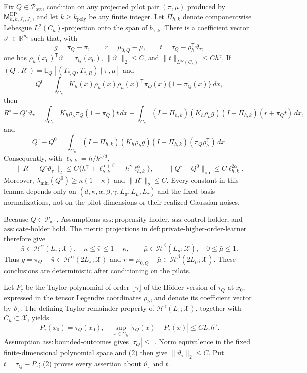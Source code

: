 Fix \(Q\in\mathcal P_{\mathrm{att}}\), condition on any projected pilot pair \((\bar\pi,\bar\mu)\) produced by \(\mathsf M_{h,k,J_\pi,J_\mu}^{\mathrm{DP}}\), and let \(k\ge k_{\mathrm{poly}}\) be any finite integer.  Let \(\Pi_{h,k}\) denote componentwise Lebesgue \(L^2(C_h)\)-projection onto the span of \(b_{h,k}\).  There is a coefficient vector \(\vartheta_\tau\in\mathbb R^{p_\gamma}\) such that, with
\[
 g=\pi_Q-\bar\pi,\qquad r=\mu_{0,Q}-\bar\mu,
 \qquad t=\tau_Q-\rho_h^{\mathsf T}\vartheta_\tau,
\]
one has \(\rho_h(x_0)^{\mathsf T}\vartheta_\tau=\tau_Q(x_0)\), \(\lVert\vartheta_\tau\rVert_2\le C\), and \(\lVert t\rVert_{L^\infty(C_h)}\le Ch^\gamma\).  If \((Q^\circ,R^\circ)=\mathbb E_Q[(T_{*,Q},T_{*,R})\mid\bar\pi,\bar\mu]\) and
\[
 Q^0=\int_{C_h}K_h(x)\rho_h(x)\rho_h(x)^{\mathsf T}
       \pi_Q(x)\{1-\pi_Q(x)\}\,dx,
\]
then
\[
 R^\circ-Q^\circ\vartheta_\tau
 =\int_{C_h}K_h\rho_h\pi_Q(1-\pi_Q)t\,dx
 +\int_{C_h}(I-\Pi_{h,k})(K_h\rho_h g)
                 (I-\Pi_{h,k})(r+\pi_Qt)\,dx,
\]
and
\[
 Q^\circ-Q^0
 =\int_{C_h}(I-\Pi_{h,k})(K_h\rho_h g)
                 (I-\Pi_{h,k})(\pi_Q\rho_h^{\mathsf T})\,dx.
\]
Consequently, with \(\ell_{h,k}=h/k^{1/d}\),
\[
 \lVert R^\circ-Q^\circ\vartheta_\tau\rVert_2
 \le C\{h^\gamma+\ell_{h,k}^{\alpha+\beta}
                  +h^\gamma\ell_{h,k}^\alpha\},
 \qquad
 \lVert Q^\circ-Q^0\rVert_{\mathrm{op}}
 \le C\ell_{h,k}^{2\alpha}.
\]
Moreover, \(\lambda_{\min}(Q^0)\ge\kappa(1-\kappa)\) and \(\lVert R^\circ\rVert_2\le C\).  Every constant in this lemma depends only on \((d,\kappa,\alpha,\beta,\gamma,L_\pi,L_\mu,L_\tau)\) and the fixed basis normalizations, not on the pilot dimensions or their realized Gaussian noises.

Because \(Q\in\mathcal P_{\mathrm{att}}\), Assumptions \(\mathrm{ass{:}propensity\text{-}holder}\), \(\mathrm{ass{:}control\text{-}holder}\), and \(\mathrm{ass{:}cate\text{-}holder}\) hold.  The metric projections in \(\mathrm{def{:}private\text{-}higher\text{-}order\text{-}learner}\) therefore give
\[
 \bar\pi\in\mathcal H^\alpha(L_\pi;\mathcal X),\quad
 \kappa\le\bar\pi\le1-\kappa,
 \qquad
 \bar\mu\in\mathcal H^\beta(L_\mu;\mathcal X),\quad
 0\le\bar\mu\le1.
\tag{1}
\]
Thus \(g=\pi_Q-\bar\pi\in\mathcal H^\alpha(2L_\pi;\mathcal X)\) and \(r=\mu_{0,Q}-\bar\mu\in\mathcal H^\beta(2L_\mu;\mathcal X)\).  These conclusions are deterministic after conditioning on the pilots.

Let \(P_\tau\) be the Taylor polynomial of order \(\lfloor\gamma\rfloor\) of the H\"older version of \(\tau_Q\) at \(x_0\), expressed in the tensor Legendre coordinates \(\rho_h\), and denote its coefficient vector by \(\vartheta_\tau\).  The defining Taylor-remainder property of \(\mathcal H^\gamma(L_\tau;\mathcal X)\), together with \(C_h\subset\mathcal X\), yields
\[
 P_\tau(x_0)=\tau_Q(x_0),\quad
 \sup_{x\in C_h}|\tau_Q(x)-P_\tau(x)|\le C L_\tau h^\gamma.
\tag{2}
\]
Assumption \(\mathrm{ass{:}bounded\text{-}outcomes}\) gives \(|\tau_Q|\le1\).  Norm equivalence in the fixed finite-dimensional polynomial space and (2) then give \(\lVert\vartheta_\tau\rVert_2\le C\).  Put \(t=\tau_Q-P_\tau\); (2) proves every assertion about \(\vartheta_\tau\) and \(t\).

